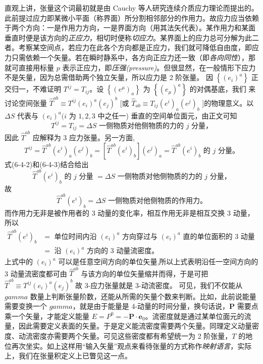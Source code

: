直观上讲，张量这个词最初就是由 Cauchy 等人研究连续介质应力理论而提出的。此前提过应力即某微小平面（称界面）所分割相邻部分的作用力。故应力应当依赖于两个方向：一是作用力方向，一是界面方向（用其法矢代表）。某作用力和某面垂直时便是该方向的\textit{正应力}，相切时便称\textit{切应力}。某界面上的应力总可分解为此二者。考察某空间点，若应力在此各个方向都是正应力，我们就可降低自由度，即应力只需依赖一个矢量。若在瞬时静系中，各方向正应力还一致（即\textit{各向同性}），那就可直接用标量 $p$ 表示正应力，即\textit{压强(pressure)}。但很显然，在一般情形下应力不是矢量，因为总需借助两个独立矢量，所以应力是 2 阶张量。
因 $\left\{\left(e_i\right)^a\right\}$ 正交归一，不难证明 $T^{i j}=T_{i j}$。设 $\left\{\left(e^\mu\right)_a\right\}$ 为 $\left\{\left(e_\mu\right)^a\right\}$ 的对偶基底，我们 来讨论空间张量 $\hat{T}^{a b} \equiv T^{i j}\left(e_i\right)^a\left(e_j\right)^b$ [或 $\hat{T}_{a b} \equiv T_{i j}\left(e^i\right)_a\left(e^j\right)_b$ ]的物理意义。以 $\Delta S$ 代表与 $\left(e_i\right)^a(i$ 为 $1,2,3$ 中之任一) 垂直的空间单位面元，由正文可知
\[
T^{i j}=T_{i j}=\Delta S \text { 一侧物质对他侧物质的力的 } j \text { 分量，}
\]
因此 $\hat{T}^{a b}$ 应解释为 3 应力张量。另一方面,
\[
T^{i j}=\hat{T}^{a b}\left(e^i\right)_a\left(e^j\right)_b=\left[\hat{T}^{a b}\left(e^i\right)_b\right]\left(e^j\right)_a=\hat{T}^{a b}\left(e^i\right)_b \text { 的 } j \text { 分量。}
\]
式(6-4-2)和(6-4-3)结合给出
\[
\hat{T}^{a b}\left(e^i\right)_b \text { 的 } j \text { 分量 }=\Delta S \text { 一侧物质对他侧物质的力的 } j \text { 分量，}
\]
故
\[
\hat{T}^{a b}\left(e^i\right)_b=\Delta S \text { 一侧物质对他侧物质的作用力。}
\]
而作用力无非是被作用者的 3 动量的变化率，相互作用无非是相互交换 3 动量，所以
\[
\begin{aligned}
\hat{T}^{a b}\left(e^i\right)_b & =\text { 单位时间内沿 }\left(e_i\right)^a \text { 方向穿过与 }\left(e_i\right)^a \text { 直的单位面积的 } 3 \text { 动量 } \\
& =\text { 沿 }\left(e_i\right)^a \text { 方向的 } 3 \text { 动量流密度。}
\end{aligned}
\]
上式中的 $\left(e_i\right)^a$ 可以是任意空间方向的单位矢量,所以上式表明沿任一空间方向的 3 动量流密度都可由 $\hat{T}^{a b}$ 与该方向的单位矢量缩并而得，于是可把 $\hat{T}^{a b} \equiv T^{i j}\left(e_i\right)^a\left(e_j\right)^b$
故 3-应力张量就是 3-动流密度。
可见，我们不仅能从 $gamma$ 数量上判断张量阶数，还能从所需的矢量个数来判断。比如，此前说能量需要变换一个 $gamma$，就是由于能量是 4-动量的时间分量，换句话说，$\bm P$ 需要点乘一个矢量，才能定义能量 $E=P^0=-\bm P\cdot \bm e_0$。流密度就是通过某单位面元的流量，因此需要定义表面的矢量。于是定义能流密度需要两个矢量。同理定义动量密度、动流密度亦需要两个矢量。可见这些密度都有希望统一为 2 阶张量，$T$ 的地位再次坐实。如上这样用“输入矢量”观点来看待张量的方式称作\textit{映射语言}，实际上，我们在张量积定义上已瞥见这一点。 

